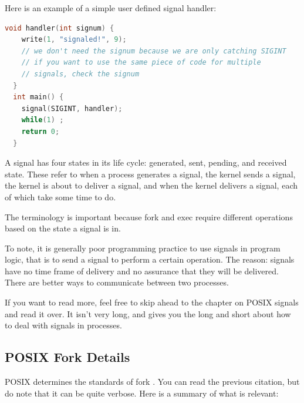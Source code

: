 \begin{itemize}
Here is an example of a simple user defined signal handler:

\begin{lstlisting}[language=C]
  void handler(int signum) {
    write(1, "signaled!", 9);
    // we don't need the signum because we are only catching SIGINT
    // if you want to use the same piece of code for multiple
    // signals, check the signum
  }
  int main() {
    signal(SIGINT, handler);
    while(1) ;
    return 0;
  }
\end{lstlisting}

A signal has four states in its life cycle: generated, sent, pending, and received state. These refer to when a process generates a signal, the kernel sends a signal, the kernel is about to deliver a signal, and when the kernel delivers a signal, each of which take some time to do.

The terminology is important because fork and exec require different operations based on the state a signal is in.

To note, it is generally poor programming practice to use signals in program logic, that is to send a signal to perform a certain operation.
The reason: signals have no time frame of delivery and no assurance that they will be delivered.
There are better ways to communicate between two processes.

If you want to read more, feel free to skip ahead to the chapter on POSIX signals and read it over. It isn't very long, and gives you the long and short about how to deal with signals in processes.

\subsection{POSIX Fork Details}

POSIX determines the standards of fork \cite{fork_2018}.
You can read the previous citation, but do note that it can be quite verbose.
Here is a summary of what is relevant:


\end{itemize}

